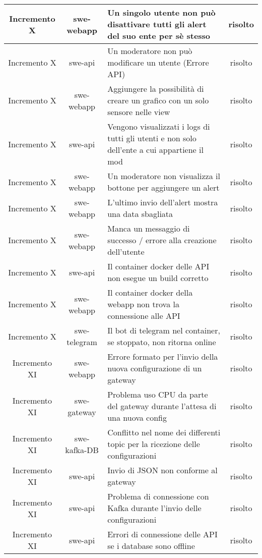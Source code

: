\begin{center}
\begin{longtable}{|c|c|p{8cm}|c|}
	    \hline
	    Incremento X & swe-webapp & Un singolo utente non può disattivare tutti gli alert del suo ente per sè stesso & risolto \\
	    \hline
	    Incremento X & swe-api & Un moderatore non può modificare un utente (Errore API) & risolto \\
	    \hline
	    Incremento X & swe-webapp & Aggiungere la possibilità di creare un grafico con un solo sensore nelle view & risolto \\
	    \hline
	    Incremento X & swe-api & Vengono visualizzati i logs di tutti gli utenti e non solo dell'ente a cui appartiene il mod & risolto \\
	    \hline
	    Incremento X & swe-webapp & Un moderatore non visualizza il bottone per aggiungere un alert & risolto \\
	    \hline
	    Incremento X & swe-webapp & L'ultimo invio dell'alert mostra una data sbagliata  & risolto \\
	    \hline
	    Incremento X & swe-webapp & Manca un messaggio di successo / errore alla creazione dell'utente & risolto \\
	    \hline
	    Incremento X & swe-api & Il container docker delle API non esegue un build corretto & risolto \\
	    \hline
	    Incremento X & swe-webapp & Il container docker della webapp non trova la connessione alle API & risolto \\
	    \hline
	    Incremento X & swe-telegram & Il bot di telegram nel container, se stoppato, non ritorna online & risolto \\
	    \hline
	    Incremento XI & swe-webapp & Errore formato per l'invio della nuova configurazione di un gateway & risolto \\
	    \hline
	    Incremento XI & swe-gateway & Problema uso CPU da parte del gateway durante l'attesa di una nuova config  & risolto \\
	    \hline
	    Incremento XI & swe-kafka-DB & Conflitto nel nome dei differenti topic per la ricezione delle configurazioni & risolto \\
	    \hline
	    Incremento XI & swe-api & Invio di JSON non conforme al gateway & risolto \\
	    \hline
	    Incremento XI & swe-api & Problema di connessione con Kafka durante l'invio delle configurazioni & risolto \\
	    \hline
	    Incremento XI & swe-api & Errori di connessione delle API se i database sono offline & risolto \\

\end{longtable}
\end{center}
